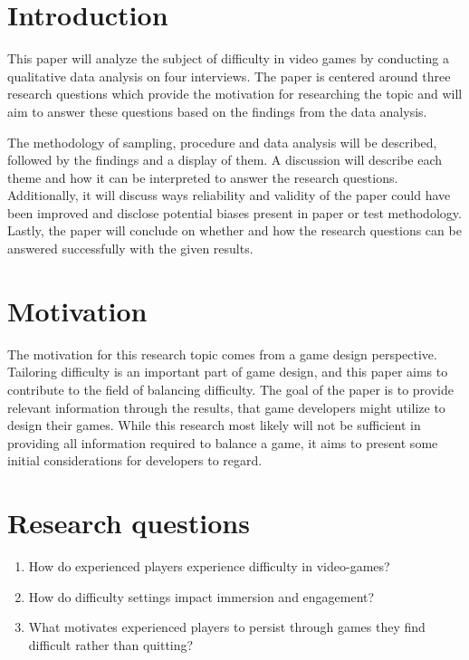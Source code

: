 
\section{Introduction}

This paper will analyze the subject of difficulty in video games by conducting a qualitative data analysis on four interviews. The paper is centered around three research questions which provide the motivation for researching the topic and will aim to answer these questions based on the findings from the data analysis. 

The methodology of sampling, procedure and data analysis will be described, followed by the findings and a display of them. A discussion will describe each theme and how it can be interpreted to answer the research questions. Additionally, it will discuss ways reliability and validity of the paper could have been improved and disclose potential biases present in paper or test methodology. Lastly, the paper will conclude on whether and how the research questions can be answered successfully with the given results. 

\section{Motivation}

The motivation for this research topic comes from a game design perspective. Tailoring difficulty is an important part of game design, and this paper aims to contribute to the field of balancing difficulty. The goal of the paper is to provide relevant information through the results, that game developers might utilize to design their games. While this research most likely will not be sufficient in providing all information required to balance a game, it aims to present some initial considerations for developers to regard.

\section{Research questions} \label{Research questions}

\begin{enumerate}
    \item How do experienced players experience difficulty in video-games?
    \item How do difficulty settings impact immersion and engagement? 
    \item What motivates experienced players to persist through games they find difficult rather than quitting?
\end{enumerate}


